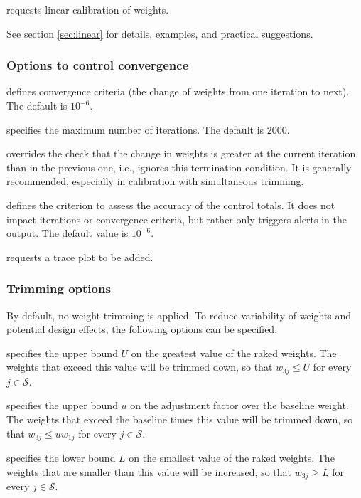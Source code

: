 \hangpara
{}
requests linear calibration of weights.

See section \ref{sec:linear} for details, examples, and practical suggestions.


\subsubsection{Options to control convergence}

\hangpara
{} defines convergence criteria
(the change of weights from one iteration to next). The default is $10^{-6}$.

\hangpara
{} specifies the maximum number
of iterations. The default is 2000.

\hangpara
{} overrides the check
that the change in weights is greater at the current iteration
than in the previous one, i.e., ignores this termination condition.
It is generally recommended, especially in calibration with simultaneous trimming.

\hangpara
{} defines the criterion to
assess the accuracy of the control totals. It does not impact
iterations or convergence criteria, but rather only triggers alerts in the output.
The default value is $10^{-6}$.

\hangpara
{} requests a trace plot to be added.

\subsubsection{Trimming options}
\label{subsubsec:trimming}

By default, no weight trimming is applied. To reduce variability of weights
and potential design effects, the following options can be specified.

\hangpara
{} specifies the upper bound $U$ on the greatest
    value of the raked weights.  The weights that
    exceed this value will be trimmed down, so that
    $w_{3j} \le U$ for every $j\in\mathcal{S}$.

\hangpara
{} specifies the upper bound $u$ on the adjustment
    factor over the baseline weight. The weights
    that exceed the baseline times this value will be trimmed down,
    so that $w_{3j} \le u w_{1j}$ for every $j\in\mathcal{S}$.

\hangpara
{} specifies the lower bound $L$ on the smallest value
    of the raked weights.  The weights that are smaller than this value will
    be increased, so that $w_{3j} \ge L$ for every $j\in\mathcal{S}$.

